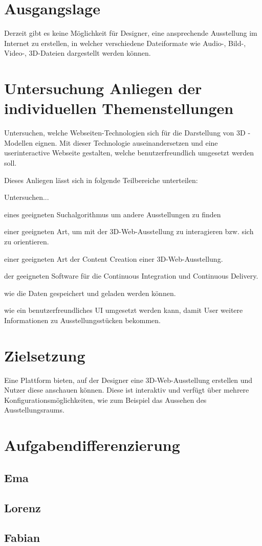 \section{Ausgangslage}
Derzeit gibt es keine Möglichkeit für Designer, eine ansprechende Ausstellung im Internet zu erstellen, in welcher verschiedene Dateiformate wie Audio-, Bild-, Video-, 3D-Dateien dargestellt werden können.

\section{Untersuchung Anliegen der individuellen Themenstellungen}
Untersuchen, welche Webseiten-Technologien sich für die Darstellung von 3D - Modellen eignen. Mit dieser Technologie auseinandersetzen und eine userinteractive Webseite gestalten, welche benutzerfreundlich umgesetzt werden soll.

Dieses Anliegen lässt sich in folgende Teilbereiche unterteilen:

Untersuchen...
\begin{compactitem}
    \item eines geeigneten Suchalgorithmus um andere Ausstellungen zu finden
    \item einer geeigneten Art, um mit der 3D-Web-Ausstellung zu interagieren bzw. sich zu orientieren.
    \item einer geeigneten Art der Content Creation einer 3D-Web-Ausstellung.
    \item der geeigneten Software für die Continuous Integration und Continuous Delivery.
    \item wie die Daten gespeichert und geladen werden können.
    \item wie ein benutzerfreundliches UI umgesetzt werden kann, damit User weitere Informationen zu Ausstellungsstücken bekommen.
\end{compactitem}

\section{Zielsetzung}
Eine Plattform bieten, auf der Designer eine 3D-Web-Ausstellung erstellen und Nutzer diese anschauen können. Diese ist interaktiv und verfügt über mehrere Konfigurationsmöglichkeiten, wie zum Beispiel das Aussehen des Ausstellungsraums.

\section{Aufgabendifferenzierung}
\subsection{Ema}
\subsection{Lorenz}
\subsection{Fabian}
	
